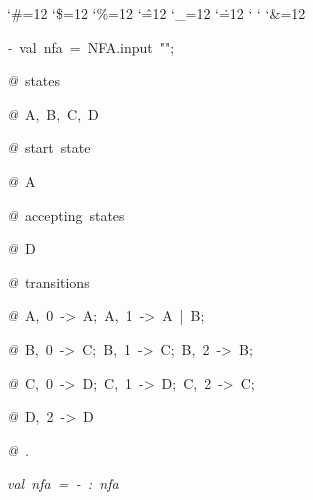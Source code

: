 \begin{list}{}
{\setlength{\leftmargin}{\leftmargini}
\setlength{\rightmargin}{0cm}
\setlength{\itemindent}{0cm}
\setlength{\listparindent}{0cm}
\setlength{\itemsep}{0cm}
\setlength{\parsep}{0cm}
\setlength{\labelsep}{0cm}
\setlength{\labelwidth}{0cm}
\catcode`\#=12
\catcode`\$=12
\catcode`\%=12
\catcode`\^=12
\catcode`\_=12
\catcode`\.=12
\catcode`
\catcode`
\catcode`\&=12
\ttfamily}
\small
\item[]\textsl{-\ }val\ nfa\ =\ NFA.input\ "";
\item[]\textsl{@\ }states
\item[]\textsl{@\ }A,\ B,\ C,\ D
\item[]\textsl{@\ }start\ state
\item[]\textsl{@\ }A
\item[]\textsl{@\ }accepting\ states
\item[]\textsl{@\ }D
\item[]\textsl{@\ }transitions
\item[]\textsl{@\ }A,\ 0\ ->\ A;\ A,\ 1\ ->\ A\ |\ B;
\item[]\textsl{@\ }B,\ 0\ ->\ C;\ B,\ 1\ ->\ C;\ B,\ 2\ ->\ B;
\item[]\textsl{@\ }C,\ 0\ ->\ D;\ C,\ 1\ ->\ D;\ C,\ 2\ ->\ C;
\item[]\textsl{@\ }D,\ 2\ ->\ D
\item[]\textsl{@\ }.
\item[]\textsl{val\ nfa\ =\ -\ :\ nfa}
\end{list}
